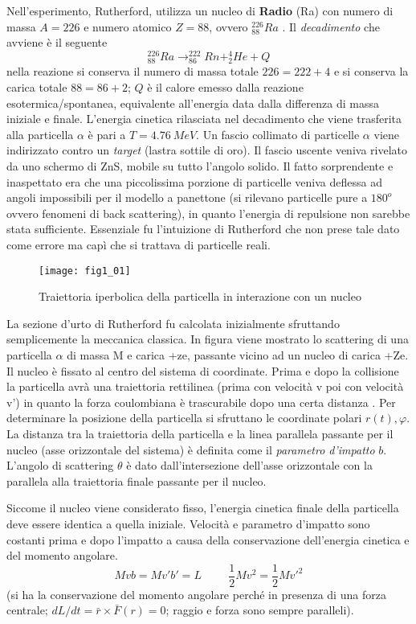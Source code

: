 Nell'esperimento, Rutherford, utilizza un nucleo di \textbf{Radio} (Ra) con numero di massa $A=226$ e numero atomico $Z=88$, ovvero $^{226}_{88} Ra$ .
Il \emph{decadimento} che avviene è il seguente
\begin{equation}
^{226}_{88} Ra \longrightarrow ^{222}_{86}Rn + ^{4}_{2}He + Q
\end{equation}
nella reazione si conserva il numero di massa totale $ 226 = 222 + 4 $ e si conserva la carica totale $ 88 = 86 + 2 $;
$Q$ è il calore emesso dalla reazione esotermica/spontanea, equivalente all'energia data dalla differenza di massa iniziale e finale. 
L'energia cinetica rilasciata nel decadimento che viene trasferita alla particella $\alpha$ è pari a $T = \SI{4.76}{MeV}$.
Un fascio collimato di particelle $\alpha$ viene indirizzato contro un \emph{target} (lastra sottile di oro).
Il fascio uscente veniva rivelato da uno schermo di ZnS, mobile su tutto l'angolo solido.
Il fatto sorprendente e inaspettato era che una piccolissima porzione di particelle veniva deflessa ad angoli impossibili per il modello a panettone (si rilevano particelle pure a $180^o$ ovvero fenomeni di back scattering), in quanto l'energia di repulsione non sarebbe stata sufficiente.
Essenziale fu l'intuizione di Rutherford che non prese tale dato come errore ma capì che si trattava di particelle reali.
\begin{figure}[h]
\centering
\texttt{[image: fig1\_01]}
\caption{Traiettoria iperbolica della particella in interazione con un nucleo}
\label{fig:1.1}
\end{figure}
La sezione d'urto di Rutherford fu calcolata inizialmente sfruttando semplicemente la meccanica classica.
In figura viene mostrato lo scattering di una particella $\alpha$ di massa M e carica +ze, passante vicino ad un nucleo di carica +Ze.
Il nucleo è fissato al centro del sistema di coordinate.
Prima e dopo la collisione la particella avrà una traiettoria rettilinea (prima con velocità v poi con velocità v') in quanto la forza coulombiana è trascurabile dopo una certa distanza .
Per determinare la posizione della particella si sfruttano le coordinate polari $r(t), \varphi$. 
La distanza tra la traiettoria della particella e la linea parallela passante per il nucleo (asse orizzontale del sistema) è definita come il \emph{parametro d'impatto} $b$.
L'angolo di scattering $\theta$ è dato dall'intersezione dell'asse orizzontale con la parallela alla traiettoria finale passante per il nucleo.

Siccome il nucleo viene considerato fisso, l'energia cinetica finale della particella deve essere identica a quella iniziale. 
Velocità e parametro d'impatto sono costanti prima e dopo l'impatto a causa della conservazione dell'energia cinetica e del momento angolare.
\[Mvb=Mv'b'=L \hspace{1cm} \frac{1}{2}Mv^2=\frac{1}{2}Mv'^2\]
(si ha la conservazione del momento angolare perché in presenza di una forza centrale; $dL/dt=\bar r \times \bar F (r)=0$; raggio e forza sono sempre paralleli).

